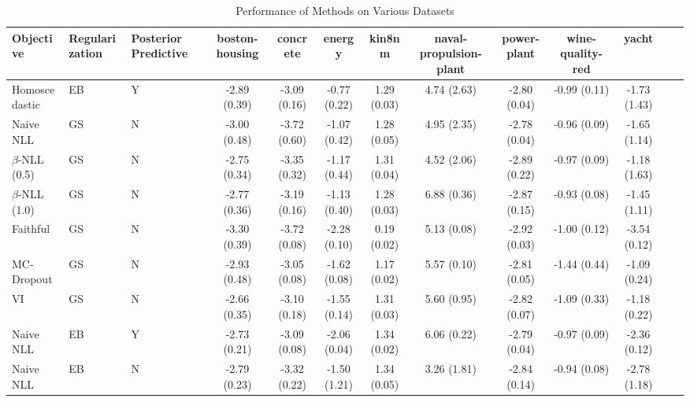 \begin{table}
\centering
\caption{Performance of Methods on Various Datasets}
\label{tab:results}
\begin{tabular}{|l|l|l|c|c|c|c|c|c|c|c|c|c|}
\toprule
        Objective & Regularization & Posterior Predictive & boston-housing &     concrete &       energy &      kin8nm & naval-propulsion-plant &  power-plant & wine-quality-red &        yacht \\
\midrule
    Homoscedastic &             EB &                    Y &   -2.89 (0.39) & -3.09 (0.16) & -0.77 (0.22) & 1.29 (0.03) &            4.74 (2.63) & -2.80 (0.04) &     -0.99 (0.11) & -1.73 (1.43) \\
        Naive NLL &             GS &                    N &   -3.00 (0.48) & -3.72 (0.60) & -1.07 (0.42) & 1.28 (0.05) &            4.95 (2.35) & -2.78 (0.04) &     -0.96 (0.09) & -1.65 (1.14) \\
$\beta$-NLL (0.5) &             GS &                    N &   -2.75 (0.34) & -3.35 (0.32) & -1.17 (0.44) & 1.31 (0.04) &            4.52 (2.06) & -2.89 (0.22) &     -0.97 (0.09) & -1.18 (1.63) \\
$\beta$-NLL (1.0) &             GS &                    N &   -2.77 (0.36) & -3.19 (0.16) & -1.13 (0.40) & 1.28 (0.03) &            6.88 (0.36) & -2.87 (0.15) &     -0.93 (0.08) & -1.45 (1.11) \\
         Faithful &             GS &                    N &   -3.30 (0.39) & -3.72 (0.08) & -2.28 (0.10) & 0.19 (0.02) &            5.13 (0.08) & -2.92 (0.03) &     -1.00 (0.12) & -3.54 (0.12) \\
       MC-Dropout &             GS &                    N &   -2.93 (0.48) & -3.05 (0.08) & -1.62 (0.08) & 1.17 (0.02) &            5.57 (0.10) & -2.81 (0.05) &     -1.44 (0.44) & -1.09 (0.24) \\
               VI &             GS &                    N &   -2.66 (0.35) & -3.10 (0.18) & -1.55 (0.14) & 1.31 (0.03) &            5.60 (0.95) & -2.82 (0.07) &     -1.09 (0.33) & -1.18 (0.22) \\
        Naive NLL &             EB &                    Y &   -2.73 (0.21) & -3.09 (0.08) & -2.06 (0.04) & 1.34 (0.02) &            6.06 (0.22) & -2.79 (0.04) &     -0.97 (0.09) & -2.36 (0.12) \\
        Naive NLL &             EB &                    N &   -2.79 (0.23) & -3.32 (0.22) & -1.50 (1.21) & 1.34 (0.05) &            3.26 (1.81) & -2.84 (0.14) &     -0.94 (0.08) & -2.78 (1.18) \\

\end{tabular}
\end{table}
